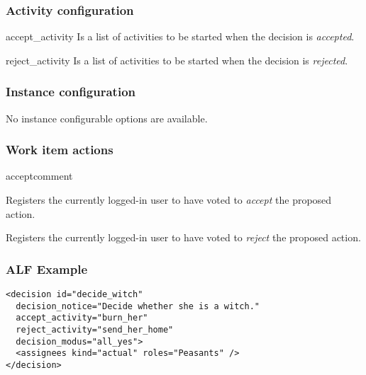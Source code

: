   \subsubsection{Activity configuration}

    \begin{memberdesc}{accept\_activity}
        Is a list of activities to be started when the decision is \emph{accepted}.
    \end{memberdesc}

    \begin{memberdesc}{reject\_activity}
      Is a list of activities to be started when the decision is \emph{rejected}.
    \end{memberdesc}

  \subsubsection{Instance configuration}

  No instance configurable options are available.
     
  \subsubsection{Work item actions} %

    \begin{funcdesc}{accept}{comment}
        
         Registers the currently logged-in user to have voted to \emph{accept}
            the proposed action.    

         Registers the currently logged-in user to have voted to \emph{reject}
            the proposed action.    

    \end{funcdesc}

  \subsubsection{ALF Example}

\begin{verbatim}
<decision id="decide_witch"
  decision_notice="Decide whether she is a witch."
  accept_activity="burn_her"
  reject_activity="send_her_home"
  decision_modus="all_yes">
  <assignees kind="actual" roles="Peasants" />
</decision>
\end{verbatim}

